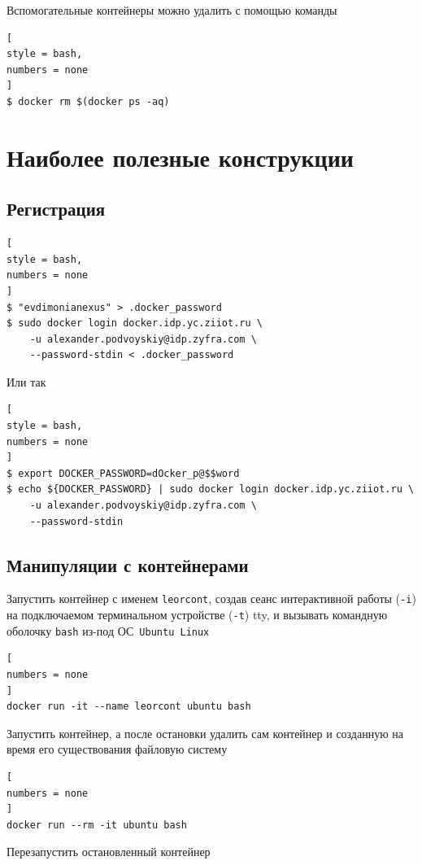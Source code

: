 \documentclass[%
	11pt,
	a4paper,
	utf8,
		]{article}
\begin{document}
Вспомогательные контейнеры можно удалить с помощью команды
\begin{lstlisting}[
style = bash,
numbers = none
]
$ docker rm $(docker ps -aq)
\end{lstlisting}


\section{Наиболее полезные конструкции}

\subsection{Регистрация}

\begin{lstlisting}[
style = bash,
numbers = none
]
$ "evdimonianexus" > .docker_password
$ sudo docker login docker.idp.yc.ziiot.ru \
    -u alexander.podvoyskiy@idp.zyfra.com \
    --password-stdin < .docker_password
\end{lstlisting}

Или так
\begin{lstlisting}[
style = bash,
numbers = none
]
$ export DOCKER_PASSWORD=dOcker_p@$$word
$ echo ${DOCKER_PASSWORD} | sudo docker login docker.idp.yc.ziiot.ru \
    -u alexander.podvoyskiy@idp.zyfra.com \
    --password-stdin
\end{lstlisting}

\subsection{Манипуляции с контейнерами}

Запустить контейнер с именем \texttt{leorcont}, создав сеанс интерактивной работы (\texttt{-i}) на подключаемом терминальном устройстве (\texttt{-t}) tty, и вызывать командную оболочку \texttt{bash} из-под ОС~\texttt{Ubuntu Linux}

\begin{lstlisting}[
numbers = none
]
docker run -it --name leorcont ubuntu bash
\end{lstlisting}

Запустить контейнер, а после остановки удалить сам контейнер и созданную на время его существования файловую систему

\begin{lstlisting}[
numbers = none
]
docker run --rm -it ubuntu bash
\end{lstlisting}

Перезапустить остановленный контейнер
\end{document}
